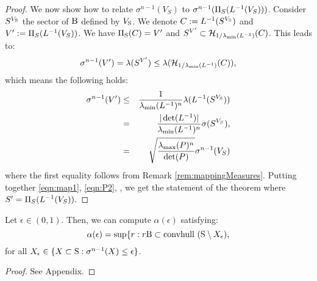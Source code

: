 \begin{proof}

We now show how to relate $\sigma^{n-1}(V_S)$ to $\sigma^{n-1}(\Pi_S(L^{-1}(V_S)))$. Consider $S^{V_{\text{S}}}$ the sector of $\text{B}$ defined by $V_{\text{S}}$. We denote $C:= L^{-1}(S^{V_{\text{S}}})$ and $V':=\Pi_S(L^{-1}(V_S))$. We have $\Pi_{\text{S}}(C) = V'$ and $S^{V'} \subset \mathcal{H}_{1/ \lambda_{\min}(L^{-1})}(C)$.  This leads to:
$$\sigma^{n-1}(V') = \lambda(S^{V'}) \leq \lambda (\mathcal{H}_{1/ \lambda_{\min}(L^{-1})}(C)),$$ which means the following holds:
\begin{eqnarray}\nonumber\sigma^{n-1}(V') &\leq& \frac{1}{\lambda_{\min}(L^{-1})^n} \lambda( L^{-1}(S^{V_{\text{S}}}))\\ \nonumber &=&\frac{|\det(L^{-1})|}{\lambda_{\min}(L^{-1})^n}\sigma(S^{V_S}),\\
 \label{eqn:map1} &=&\sqrt{\frac{\lambda_{\max}(P)^n}{\det(P)}}\sigma^{n-1}(V_S)
\end{eqnarray}
where the first equality follows from Remark \ref{rem:mappingMeasures}.
Putting together \eqref{eqn:map1}, \eqref{eqn:P2}, \label{eqn:P}, we get the statement of the theorem where $S' = \Pi_S(L^{-1}(V_S)).$
\end{proof}


\begin{lemma}\label{lemma:eps}Let $\epsilon \in (0, 1)$. Then, we can compute $\alpha(\epsilon)$ satisfying:
\begin{equation}\label{eqn:ballinc}\alpha(\epsilon) = \sup\{r: r\text{B} \subset \mbox{convhull }(\text{S} \setminus X_\epsilon),
\end{equation}
for all $X_\epsilon \in \{X \subset \text{S}: \sigma^{n-1}(X) \leq \epsilon\}$. 
\end{lemma}

\begin{proof}See Appendix.
\end{proof}

